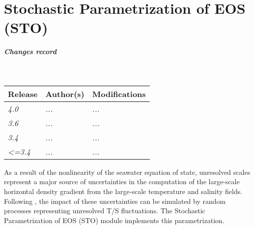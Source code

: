 \documentclass[../main/NEMO_manual]{subfiles}
\begin{document}
\chapter{Stochastic Parametrization of EOS (STO)}
\label{chap:STO}

\chaptertoc

\paragraph{Changes record} ~\\

{\footnotesize
  \begin{tabularx}{\textwidth}{l||X|X}
    Release & Author(s) & Modifications \\
    \hline
    {\em   4.0} & {\em ...} & {\em ...} \\
    {\em   3.6} & {\em ...} & {\em ...} \\
    {\em   3.4} & {\em ...} & {\em ...} \\
    {\em <=3.4} & {\em ...} & {\em ...}
  \end{tabularx}
}


\clearpage

As a result of the nonlinearity of the seawater equation of state, unresolved scales represent a major source of uncertainties in the computation of the large-scale horizontal density gradient from the large-scale temperature and salinity fields. Following  \cite{brankart_OM13}, the impact of these uncertainties can be simulated by random processes representing unresolved T/S fluctuations. The Stochastic Parametrization of EOS (STO) module implements this parametrization.
\end{document}
